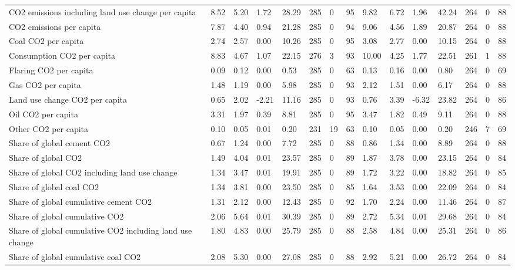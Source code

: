 \begin{longtable}{lllllllllllllll}
CO2 emissions including land use change per capita & 8.52 & 5.20 & 1.72 & 28.29 & 285 & 0 & 95 & 9.82 & 6.72 & 1.96 & 42.24 & 264 & 0 & 88\\
CO2 emissions per capita & 7.87 & 4.40 & 0.94 & 21.28 & 285 & 0 & 94 & 9.06 & 4.56 & 1.89 & 20.87 & 264 & 0 & 88\\
Coal CO2 per capita & 2.74 & 2.57 & 0.00 & 10.26 & 285 & 0 & 95 & 3.08 & 2.77 & 0.00 & 10.15 & 264 & 0 & 88\\
\addlinespace
Consumption CO2 per capita & 8.83 & 4.67 & 1.07 & 22.15 & 276 & 3 & 93 & 10.00 & 4.25 & 1.77 & 22.51 & 261 & 1 & 88\\
Flaring CO2 per capita & 0.09 & 0.12 & 0.00 & 0.53 & 285 & 0 & 63 & 0.13 & 0.16 & 0.00 & 0.80 & 264 & 0 & 69\\
Gas CO2 per capita & 1.48 & 1.19 & 0.00 & 5.98 & 285 & 0 & 93 & 2.12 & 1.51 & 0.00 & 6.17 & 264 & 0 & 88\\
Land use change CO2 per capita & 0.65 & 2.02 & -2.21 & 11.16 & 285 & 0 & 93 & 0.76 & 3.39 & -6.32 & 23.82 & 264 & 0 & 86\\
Oil CO2 per capita & 3.31 & 1.97 & 0.39 & 8.81 & 285 & 0 & 95 & 3.47 & 1.82 & 0.49 & 9.11 & 264 & 0 & 88\\
\addlinespace
Other CO2 per capita & 0.10 & 0.05 & 0.01 & 0.20 & 231 & 19 & 63 & 0.10 & 0.05 & 0.00 & 0.20 & 246 & 7 & 69\\
Share of global cement CO2 & 0.67 & 1.24 & 0.00 & 7.72 & 285 & 0 & 88 & 0.86 & 1.34 & 0.00 & 8.89 & 264 & 0 & 88\\
Share of global CO2 & 1.49 & 4.04 & 0.01 & 23.57 & 285 & 0 & 89 & 1.87 & 3.78 & 0.00 & 23.15 & 264 & 0 & 84\\
Share of global CO2 including land use change & 1.34 & 3.47 & 0.01 & 19.91 & 285 & 0 & 89 & 1.72 & 3.22 & 0.00 & 18.82 & 264 & 0 & 85\\
Share of global coal CO2 & 1.34 & 3.81 & 0.00 & 23.50 & 285 & 0 & 85 & 1.64 & 3.53 & 0.00 & 22.09 & 264 & 0 & 84\\
\addlinespace
Share of global cumulative cement CO2 & 1.31 & 2.12 & 0.00 & 12.43 & 285 & 0 & 92 & 1.70 & 2.24 & 0.00 & 11.46 & 264 & 0 & 87\\
Share of global cumulative CO2 & 2.06 & 5.64 & 0.01 & 30.39 & 285 & 0 & 89 & 2.72 & 5.34 & 0.01 & 29.68 & 264 & 0 & 84\\
Share of global cumulative CO2 including land use change & 1.80 & 4.83 & 0.00 & 25.79 & 285 & 0 & 88 & 2.58 & 4.84 & 0.00 & 25.31 & 264 & 0 & 86\\
Share of global cumulative coal CO2 & 2.08 & 5.30 & 0.00 & 27.08 & 285 & 0 & 88 & 2.92 & 5.21 & 0.00 & 26.72 & 264 & 0 & 84\\

\end{longtable}
